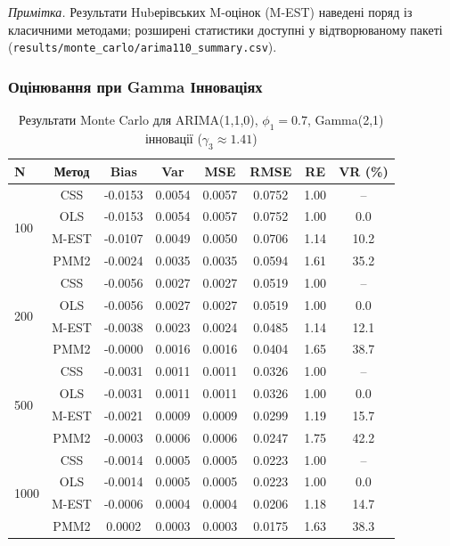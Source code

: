 \documentclass[12pt,a4paper]{article}
\begin{document}
\noindent\textit{Примітка.} Результати Hubерівських M-оцінок (M-EST) наведені поряд із класичними методами; розширені статистики доступні у відтворюваному пакеті (\texttt{results/monte\_carlo/arima110\_summary.csv}).

\subsubsection{Оцінювання при Gamma Інноваціях}

\begin{table}[h]
\centering
\caption{Результати Monte Carlo для ARIMA(1,1,0), $\phi_1 = 0.7$, Gamma(2,1) інновації ($\gamma_3 \approx 1.41$)}
\label{tab:arima110_gamma}
\begin{tabular}{@{}lccccccc@{}}
\toprule
\textbf{N} & \textbf{Метод} & \textbf{Bias} & \textbf{Var} & \textbf{MSE} & \textbf{RMSE} & \textbf{RE} & \textbf{VR (\%)} \\
\midrule
\multirow{4}{*}{100} & CSS  & -0.0153 & 0.0054 & 0.0057 & 0.0752 & 1.00 & -- \\
                     & OLS  & -0.0153 & 0.0054 & 0.0057 & 0.0752 & 1.00 & 0.0 \\
                     & M-EST & -0.0107 & 0.0049 & 0.0050 & 0.0706 & 1.14 & 10.2 \\
                     & PMM2 & -0.0024 & 0.0035 & 0.0035 & 0.0594 & 1.61 & 35.2 \\
\midrule
\multirow{4}{*}{200} & CSS  & -0.0056 & 0.0027 & 0.0027 & 0.0519 & 1.00 & -- \\
                     & OLS  & -0.0056 & 0.0027 & 0.0027 & 0.0519 & 1.00 & 0.0 \\
                     & M-EST & -0.0038 & 0.0023 & 0.0024 & 0.0485 & 1.14 & 12.1 \\
                     & PMM2 & -0.0000 & 0.0016 & 0.0016 & 0.0404 & 1.65 & 38.7 \\
\midrule
\multirow{4}{*}{500} & CSS  & -0.0031 & 0.0011 & 0.0011 & 0.0326 & 1.00 & -- \\
                     & OLS  & -0.0031 & 0.0011 & 0.0011 & 0.0326 & 1.00 & 0.0 \\
                     & M-EST & -0.0021 & 0.0009 & 0.0009 & 0.0299 & 1.19 & 15.7 \\
                     & PMM2 & -0.0003 & 0.0006 & 0.0006 & 0.0247 & 1.75 & 42.2 \\
\midrule
\multirow{4}{*}{1000} & CSS  & -0.0014 & 0.0005 & 0.0005 & 0.0223 & 1.00 & -- \\
                      & OLS  & -0.0014 & 0.0005 & 0.0005 & 0.0223 & 1.00 & 0.0 \\
                      & M-EST & -0.0006 & 0.0004 & 0.0004 & 0.0206 & 1.18 & 14.7 \\
                      & PMM2 & 0.0002 & 0.0003 & 0.0003 & 0.0175 & 1.63 & 38.3 \\
\bottomrule
\end{tabular}
\end{table}
\end{document}
